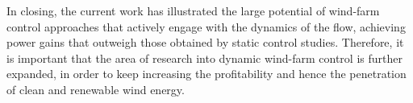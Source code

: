In closing, the current work has illustrated the large potential of wind-farm control approaches that actively engage with the dynamics of the flow, achieving power gains that outweigh those obtained by static control studies. Therefore, it is important that the area of research into dynamic wind-farm control is further expanded, in order to keep increasing the profitability and hence the penetration of clean and renewable wind energy. 
\cleardoublepage


